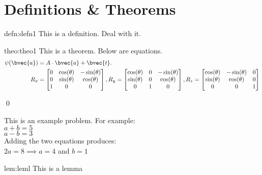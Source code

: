 \vspace{5cm} 

\section{Definitions \& Theorems}
\begin{defn}[EasyClass]{defn:defn1}
This is a definition. Deal with it.
\end{defn}

\begin{theo}{theo:theo1}
This is a theorem. Below are equations.
\begin{align}\label{eq:multi-equations}
    \psi(\bvec{a}) &= A\cdot \bvec{a} + \bvec{t}.\\
    R_x &=  \begin{bmatrix} 
            0 & \cos(\theta) & -\sin(\theta)\\
            0 & \sin(\theta) & \cos(\theta)\\
            1 & 0 & 0
         \end{bmatrix}, 
    R_y =  \begin{bmatrix} 
            \cos(\theta) & 0 & -\sin(\theta)\\
            \sin(\theta) & 0 & \cos(\theta)\\
            0 & 1 & 0
         \end{bmatrix}, 
    R_z =  \begin{bmatrix} 
            \cos(\theta) & -\sin(\theta) & 0\\
            \sin(\theta) & \cos(\theta) & 0 \\
            0 & 0 & 1
         \end{bmatrix} 
\end{align}

\qed
\end{theo}

\begin{ex}
    This is an example problem. For example: \\
    $a + b = 5$ \\
    $a - b = 3$ \\
    Adding the two equations produces: \\
    $2a = 8 \implies a = 4$ and $b = 1$
\end{ex}

\begin{lem}{lem:leml}
This is a lemma
\end{lem}

